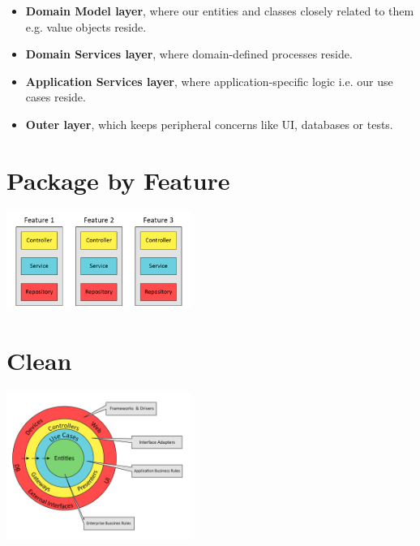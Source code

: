 \documentclass[10pt, twocolumn]{article}
\begin{document}
\begin{itemize}
    \item \textbf{Domain Model layer}, where our entities and classes closely related to them e.g. value objects reside.
    \item \textbf{Domain Services layer}, where domain-defined processes reside.
    \item \textbf{Application Services layer}, where application-specific logic i.e. our use cases reside.
    \item \textbf{Outer layer}, which keeps peripheral concerns like UI, databases or tests.
\end{itemize}

\section*{Package by Feature}

\includegraphics[width=0.45\textwidth]{package-by-feature.png}

\section*{Clean}

\includegraphics[width=0.45\textwidth]{clean.png}
\end{document}
